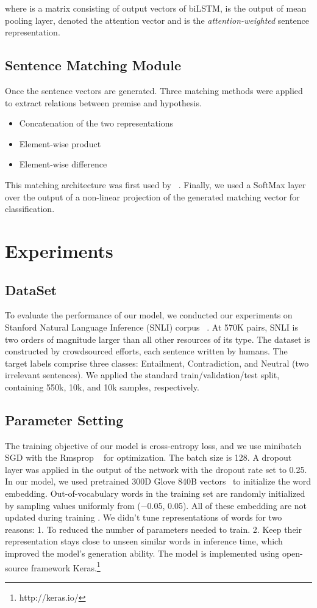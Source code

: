 \documentclass[11pt,letterpaper]{article}
\begin{document}
where  is a matrix consisting of output vectors of biLSTM,  is the output of mean pooling layer,  denoted the attention vector and  is the \emph{attention-weighted} sentence representation.
\subsection{Sentence Matching Module}
Once the sentence vectors are generated. Three matching methods were applied to extract relations between premise and hypothesis.
\begin{itemize}
\setlength{\itemsep}{0pt}
\setlength{\parsep}{0pt}
\setlength{\parskip}{0pt}
\item Concatenation of the two representations
\item Element-wise product
\item Element-wise difference
\end{itemize}
This matching architecture was first used by ~\cite{mou2015recognizing}.
Finally, we used a SoftMax layer over the output of a non-linear projection of the generated matching vector for classification.
\section{Experiments}
\label{sec:Experiments}
\subsection{DataSet}
To evaluate the performance of our model, we conducted our experiments on Stanford Natural Language Inference (SNLI) corpus ~\cite{bos2005recognising}. At 570K pairs, SNLI is two orders of magnitude larger than all other resources of its type. The dataset is constructed by crowdsourced efforts, each sentence written by humans. The target labels comprise three classes: Entailment, Contradiction, and Neutral (two irrelevant sentences). We applied the standard
train/validation/test split, containing 550k, 10k, and 10k samples, respectively.

\subsection{Parameter Setting}
The training objective of our model is cross-entropy loss, and we use minibatch SGD with the Rmsprop ~\cite{tieleman2012lecture} for optimization. The batch size is 128. A dropout layer was applied in the output of the network with the dropout rate set to 0.25. In our model, we used pretrained 300D Glove 840B vectors~\cite{pennington2014glove} to initialize the word embedding. Out-of-vocabulary words in the training set are randomly initialized by sampling values uniformly from (−0.05, 0.05). All of these embedding are not updated during training . We didn't tune representations of words for two reasons:
1. To reduced the number of parameters needed to train.
2. Keep their representation stays close to unseen similar words in inference time, which improved the model's generation ability.
The model is implemented using open-source framework Keras.\footnote{http://keras.io/}
\end{document}
